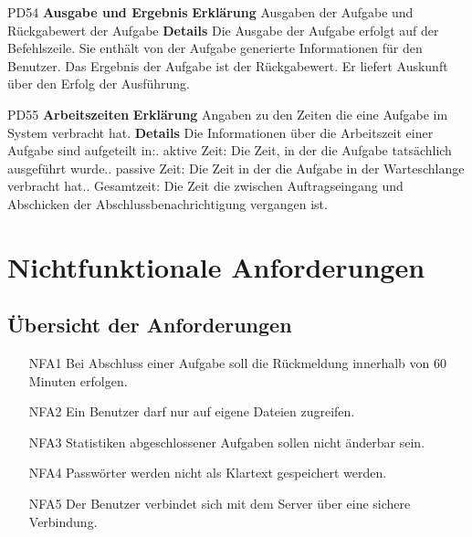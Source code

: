\documentclass[a4paper,12pt]{article}
\begin{document}
\begin{itemize}[nosep]
\begin{minipage}[t]{\linewidth}
\item[PD54] \textbf{Ausgabe und Ergebnis}
\subitem \textbf{Erklärung} Ausgaben der Aufgabe und Rückgabewert der Aufgabe
\subitem \textbf{Details} Die Ausgabe der Aufgabe erfolgt auf der \gls{Befehlszeile}. Sie enthält von der Aufgabe generierte Informationen für den Benutzer.\newline
Das Ergebnis der Aufgabe ist der Rückgabewert. Er liefert Auskunft über den Erfolg der Ausführung.
\end{minipage}
\vspace{20mm}

\begin{minipage}[t]{\linewidth}
\item[PD55] \textbf{Arbeitszeiten}
\subitem \textbf{Erklärung} Angaben zu den Zeiten die eine Aufgabe im System verbracht hat.
\subitem \textbf{Details} Die Informationen über die Arbeitszeit einer Aufgabe sind aufgeteilt in:. aktive Zeit: Die Zeit, in der die Aufgabe tatsächlich ausgeführt wurde.. passive Zeit: Die Zeit in der die Aufgabe in der Warteschlange verbracht hat.. Gesamtzeit: Die Zeit die zwischen Auftragseingang und Abschicken der Abschlussbenachrichtigung vergangen ist.
\end{minipage}
\vspace{20mm}

\end{itemize}
\newpage

\section{Nichtfunktionale Anforderungen}
\subsection{Übersicht der Anforderungen}
\begin{itemize}[nosep]
\leftskip=0.5cm

	\item[NFA1] \hspace{\parindent} Bei Abschluss einer Aufgabe soll die Rückmeldung innerhalb von 60 Minuten erfolgen.
	
	\item[NFA2] \hspace{\parindent} Ein \gls{Benutzer} darf nur auf eigene Dateien zugreifen.
	
	\item[NFA3] \hspace{\parindent} Statistiken abgeschlossener Aufgaben sollen nicht änderbar sein.
	
	\item[NFA4] \hspace{\parindent} Passwörter werden nicht als Klartext gespeichert werden.
	
	\item[NFA5] \hspace{\parindent} Der \gls{Benutzer} verbindet sich mit dem Server über eine sichere Verbindung.
\end{itemize}
\end{document}
